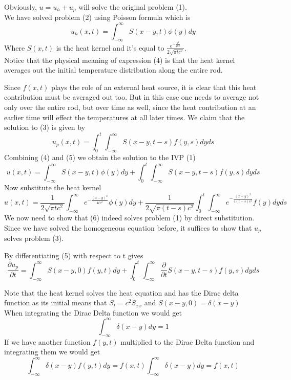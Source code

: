 \documentclass[]{article}
\begin{document}
Obviously, $u = u_h + u_p$ will solve the original problem (1).
\\
We have solved problem (2) using Poisson formula which is
\begin{equation}
    u_h(x,t) = \int_{-\infty}^{\infty}S(x-y,t) \phi(y)dy        
\end{equation}
Where $S(x,t)$ is the heat kernel and it's equal to $\displaystyle \frac{\textstyle e^{-\frac{x^2}{4tc^2}}}{2\sqrt{\pi tc^2}}$.
\\
Notice that the physical meaning of expression (4) is that the heat
kernel averages out the initial temperature distribution along the entire rod.
\par
Since $f(x, t)$ plays the role of an external heat source, it is clear that this heat contribution must be averaged out too. 
But in this case one needs to average not only over the entire rod, but over time as well, 
since the heat contribution at an earlier time will effect the temperatures at all later times. 
We claim that the solution to (3) is given by
\begin{equation}
    u_p(x,t) = \int_{0}^{t}\int_{-\infty}^{\infty}S(x-y,t-s) f(y,s)dyds
\end{equation}
Combining (4) and (5) we obtain the solution to the IVP (1)
\begin{equation}
    u(x,t)  = \int_{-\infty}^{\infty}S(x-y,t) \phi(y)dy + \int_{0}^{t}\int_{-\infty}^{\infty}S(x-y,t-s) f(y,s)dyds
\end{equation}
Now substitute the heat kernel
\[
    u(x,t) = \frac{1}{2\sqrt{\pi tc^2}}\int_{-\infty}^{\infty}e^{\textstyle -\frac{{(x-y)}^2}{4tc^2}} \phi(y)dy + \frac{1}{2\sqrt{\pi (t-s)c^2}} \int_{0}^{t} \int_{-\infty}^{\infty}e^{\textstyle -\frac{{(x-y)}^2}{4(t-s)c^2}} f(y)dyds            
\]
We now need to show that (6) indeed solves problem (1) by direct substitution. 
\\
Since we have solved the homogeneous equation before, it suffices to show that $u_p$ solves problem (3). 
\par
By differentiating (5) with respect to t gives
\[
    \frac{\partial u_p}{\partial t} = \int_{-\infty}^{\infty}S(x-y,0) f(y,t) dy  + \int_{0}^{t}\int_{-\infty}^{\infty}\frac{\partial}{\partial t}S(x-y,t-s) f(y,s)dyds    
\]
\begin{enrichment*}{}
    Note that the heat kernel solves the heat equation and has the Dirac delta function as its initial
    means that $S_t =c^2 S_{xx}$ and $S(x-y,0) = \delta(x-y)$
    \\
    When integrating the Dirac Delta function we would get
    \[
        \int_{-\infty}^{\infty}\delta(x-y) dy = 1
    \]
    If we have another function $f(y,t)$ multiplied to the Dirac Delta function and integrating them we would get
    \[
        \int_{-\infty}^{\infty}\delta(x-y) f(y,t) dy = f(x,t)\int_{-\infty}^{\infty}\delta(x-y) dy = f(x,t) 
    \]
\end{enrichment*}
\end{document}
